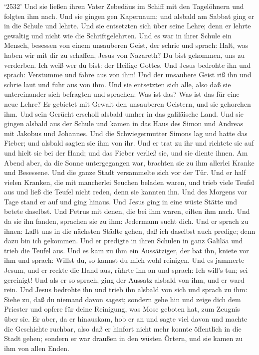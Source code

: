  `2532' Und sie ließen ihren Vater Zebedäus im Schiff mit
den Tagelöhnern und folgten ihm nach.  Und sie gingen gen
Kapernaum; und alsbald am Sabbat ging er in die Schule und lehrte.
 Und sie entsetzten sich über seine Lehre; denn er lehrte
gewaltig und nicht wie die Schriftgelehrten.  Und es war in
ihrer Schule ein Mensch, besessen von einem unsauberen Geist, der schrie
 und sprach: Halt, was haben wir mit dir zu schaffen, Jesus
von Nazareth? Du bist gekommen, uns zu verderben. Ich weiß wer du bist:
der Heilige Gottes.  Und Jesus bedrohte ihn und sprach:
Verstumme und fahre aus von ihm!  Und der unsaubere Geist
riß ihn und schrie laut und fuhr aus von ihm.  Und sie
entsetzten sich alle, also daß sie untereinander sich befragten und
sprachen: Was ist das? Was ist das für eine neue Lehre? Er gebietet mit
Gewalt den unsauberen Geistern, und sie gehorchen ihm.  Und
sein Gerücht erscholl alsbald umher in das galiläische Land.
 Und sie gingen alsbald aus der Schule und kamen in das
Haus des Simon und Andreas mit Jakobus und Johannes.  Und
die Schwiegermutter Simons lag und hatte das Fieber; und alsbald sagten
sie ihm von ihr.  Und er trat zu ihr und richtete sie auf
und hielt sie bei der Hand; und das Fieber verließ sie, und sie diente
ihnen.  Am Abend aber, da die Sonne untergegangen war,
brachten sie zu ihm allerlei Kranke und Besessene.  Und die
ganze Stadt versammelte sich vor der Tür.  Und er half
vielen Kranken, die mit mancherlei Seuchen beladen waren, und trieb
viele Teufel aus und ließ die Teufel nicht reden, denn sie kannten ihn.
 Und des Morgens vor Tage stand er auf und ging hinaus. Und
Jesus ging in eine wüste Stätte und betete daselbst.  Und
Petrus mit denen, die bei ihm waren, eilten ihm nach.  Und
da sie ihn fanden, sprachen sie zu ihm: Jedermann sucht dich.
 Und er sprach zu ihnen: Laßt uns in die nächsten Städte
gehen, daß ich daselbst auch predige; denn dazu bin ich gekommen.
 Und er predigte in ihren Schulen in ganz Galiläa und trieb
die Teufel aus.  Und es kam zu ihm ein Aussätziger, der bat
ihn, kniete vor ihm und sprach: Willst du, so kannst du mich wohl
reinigen.  Und es jammerte Jesum, und er reckte die Hand
aus, rührte ihn an und sprach: Ich will's tun; sei gereinigt!
 Und als er so sprach, ging der Aussatz alsbald von ihm,
und er ward rein.  Und Jesus bedrohte ihn und trieb ihn
alsbald von sich  und sprach zu ihm: Siehe zu, daß du
niemand davon sagest; sondern gehe hin und zeige dich dem Priester und
opfere für deine Reinigung, was Mose geboten hat, zum Zeugnis über sie.
 Er aber, da er hinauskam, hob er an und sagte viel davon
und machte die Geschichte ruchbar, also daß er hinfort nicht mehr konnte
öffentlich in die Stadt gehen; sondern er war draußen in den wüsten
Örtern, und sie kamen zu ihm von allen Enden.

